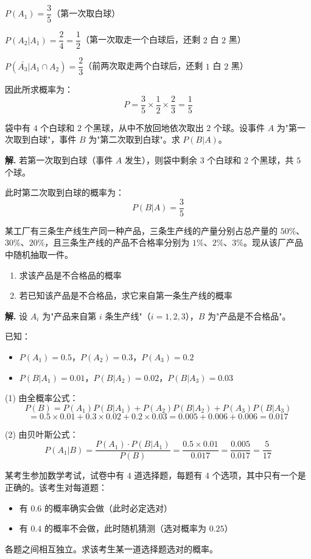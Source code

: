 \documentclass[11pt]{ctexrep}
\begin{document}
$P(A_1) = \dfrac{3}{5}$（第一次取白球）

$P(A_2 | A_1) = \dfrac{2}{4} = \dfrac{1}{2}$（第一次取走一个白球后，还剩 $2$ 白 $2$ 黑）

$P(\bar{A_3} | A_1 \cap A_2) = \dfrac{2}{3}$（前两次取走两个白球后，还剩 $1$ 白 $2$ 黑）

因此所求概率为：
\[
    P = \frac{3}{5} \times \frac{1}{2} \times \frac{2}{3} = \frac{1}{5}
\]

\begin{realexam}[2025 上海高三二模]
    袋中有 $4$ 个白球和 $2$ 个黑球，从中不放回地依次取出 $2$ 个球。设事件 $A$ 为"第一次取到白球"，事件 $B$ 为"第二次取到白球"。求 $P(B | A)$。
\end{realexam}

\textbf{解.} 若第一次取到白球（事件 $A$ 发生），则袋中剩余 $3$ 个白球和 $2$ 个黑球，共 $5$ 个球。

此时第二次取到白球的概率为：
\[
    P(B | A) = \frac{3}{5}
\]

\begin{realexam}[练习]
    某工厂有三条生产线生产同一种产品，三条生产线的产量分别占总产量的 $50\%$、$30\%$、$20\%$，且三条生产线的产品不合格率分别为 $1\%$、$2\%$、$3\%$。现从该厂产品中随机抽取一件。
    \begin{enumerate}
        \item 求该产品是不合格品的概率
        \item 若已知该产品是不合格品，求它来自第一条生产线的概率
    \end{enumerate}
\end{realexam}

\textbf{解.} 设 $A_i$ 为"产品来自第 $i$ 条生产线"（$i = 1, 2, 3$），$B$ 为"产品是不合格品"。

已知：
\begin{itemize}
    \item $P(A_1) = 0.5$，$P(A_2) = 0.3$，$P(A_3) = 0.2$
    \item $P(B | A_1) = 0.01$，$P(B | A_2) = 0.02$，$P(B | A_3) = 0.03$
\end{itemize}

(1) 由全概率公式：
\[
    P(B) = P(A_1)P(B|A_1) + P(A_2)P(B|A_2) + P(A_3)P(B|A_3)
\]
\[
    = 0.5 \times 0.01 + 0.3 \times 0.02 + 0.2 \times 0.03 = 0.005 + 0.006 + 0.006 = 0.017
\]

(2) 由贝叶斯公式：
\[
    P(A_1 | B) = \frac{P(A_1) \cdot P(B | A_1)}{P(B)} = \frac{0.5 \times 0.01}{0.017} = \frac{0.005}{0.017} = \frac{5}{17}
\]

\begin{realexam}[练习]
    某考生参加数学考试，试卷中有 $4$ 道选择题，每题有 $4$ 个选项，其中只有一个是正确的。该考生对每道题：
    \begin{itemize}
        \item 有 $0.6$ 的概率确实会做（此时必定选对）
        \item 有 $0.4$ 的概率不会做，此时随机猜测（选对概率为 $0.25$）
    \end{itemize}
    各题之间相互独立。求该考生某一道选择题选对的概率。
\end{realexam}
\end{document}
